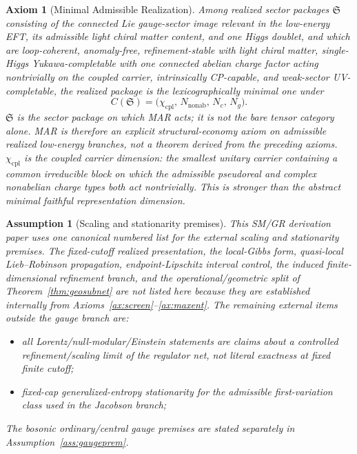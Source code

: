 \documentclass[11pt]{article}
\newtheorem{axiom}[theorem]{Axiom}
\newtheorem{assumption}[theorem]{Assumption}
\begin{document}
\begin{axiom}[Minimal Admissible Realization]\label{ax:mar}
Among realized sector packages \(\mathfrak S\) consisting of the connected Lie gauge-sector image relevant in the low-energy EFT, its admissible light chiral matter content, and one Higgs doublet, and which are loop-coherent, anomaly-free, refinement-stable with light chiral matter, single-Higgs Yukawa-completable with one connected abelian charge factor acting nontrivially on the coupled carrier, intrinsically CP-capable, and weak-sector UV-completable, the realized package is the lexicographically minimal one under
\[
C(\mathfrak S)=\bigl(\chi_{\mathrm{cpl}},\,N_{\mathrm{nonab}},\,N_c,\,N_g\bigr).
\]
\(\mathfrak S\) is the sector package on which MAR acts; it is not the bare tensor category alone. MAR is therefore an explicit structural-economy axiom on admissible realized low-energy branches, not a theorem derived from the preceding axioms. \(\chi_{\mathrm{cpl}}\) is the coupled carrier dimension: the smallest unitary carrier containing a common irreducible block on which the admissible pseudoreal and complex nonabelian charge types both act nontrivially. This is stronger than the abstract minimal faithful representation dimension.
\end{axiom}

\begin{assumption}[Scaling and stationarity premises]\label{ass:technical}
This SM/GR derivation paper uses one canonical numbered list for the external scaling and stationarity premises. The fixed-cutoff realized presentation, the local-Gibbs form, quasi-local Lieb--Robinson propagation, endpoint-Lipschitz interval control, the induced finite-dimensional refinement branch, and the operational/geometric split of Theorem~\ref{thm:geosubnet} are not listed here because they are established internally from Axioms~\ref{ax:screen}--\ref{ax:maxent}. The remaining external items outside the gauge branch are:
\begin{itemize}[leftmargin=2.3em]
\item[\textbf{T2}] all Lorentz/null-modular/Einstein statements are claims about a controlled refinement/scaling limit of the regulator net, not literal exactness at fixed finite cutoff;
\item[\textbf{T3}] fixed-cap generalized-entropy stationarity for the admissible first-variation class used in the Jacobson branch;
\end{itemize}
The bosonic ordinary/central gauge premises are stated separately in Assumption~\ref{ass:gaugeprem}.
\end{assumption}
\end{document}
